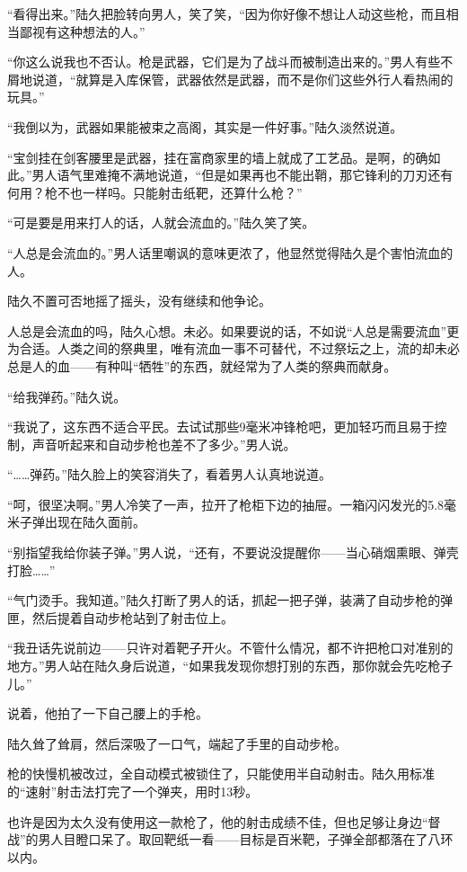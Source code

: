 “看得出来。”陆久把脸转向男人，笑了笑，“因为你好像不想让人动这些枪，而且相当鄙视有这种想法的人。”

“你这么说我也不否认。枪是武器，它们是为了战斗而被制造出来的。”男人有些不屑地说道，“就算是入库保管，武器依然是武器，而不是你们这些外行人看热闹的玩具。”

“我倒以为，武器如果能被束之高阁，其实是一件好事。”陆久淡然说道。

“宝剑挂在剑客腰里是武器，挂在富商家里的墙上就成了工艺品。是啊，的确如此。”男人语气里难掩不满地说道，“但是如果再也不能出鞘，那它锋利的刀刃还有何用？枪不也一样吗。只能射击纸靶，还算什么枪？”

“可是要是用来打人的话，人就会流血的。”陆久笑了笑。

“人总是会流血的。”男人话里嘲讽的意味更浓了，他显然觉得陆久是个害怕流血的人。

陆久不置可否地摇了摇头，没有继续和他争论。

人总是会流血的吗，陆久心想。未必。如果要说的话，不如说“人总是需要流血”更为合适。人类之间的祭典里，唯有流血一事不可替代，不过祭坛之上，流的却未必总是人的血——有种叫“牺牲”的东西，就经常为了人类的祭典而献身。

“给我弹药。”陆久说。

“我说了，这东西不适合平民。去试试那些9毫米冲锋枪吧，更加轻巧而且易于控制，声音听起来和自动步枪也差不了多少。”男人说。

“……弹药。”陆久脸上的笑容消失了，看着男人认真地说道。

“呵，很坚决啊。”男人冷笑了一声，拉开了枪柜下边的抽屉。一箱闪闪发光的5.8毫米子弹出现在陆久面前。

“别指望我给你装子弹。”男人说，“还有，不要说没提醒你——当心硝烟熏眼、弹壳打脸……”

“气门烫手。我知道。”陆久打断了男人的话，抓起一把子弹，装满了自动步枪的弹匣，然后提着自动步枪站到了射击位上。

“我丑话先说前边——只许对着靶子开火。不管什么情况，都不许把枪口对准别的地方。”男人站在陆久身后说道，“如果我发现你想打别的东西，那你就会先吃枪子儿。”

说着，他拍了一下自己腰上的手枪。

陆久耸了耸肩，然后深吸了一口气，端起了手里的自动步枪。

枪的快慢机被改过，全自动模式被锁住了，只能使用半自动射击。陆久用标准的“速射”射击法打完了一个弹夹，用时13秒。

也许是因为太久没有使用这一款枪了，他的射击成绩不佳，但也足够让身边“督战”的男人目瞪口呆了。取回靶纸一看——目标是百米靶，子弹全部都落在了八环以内。

